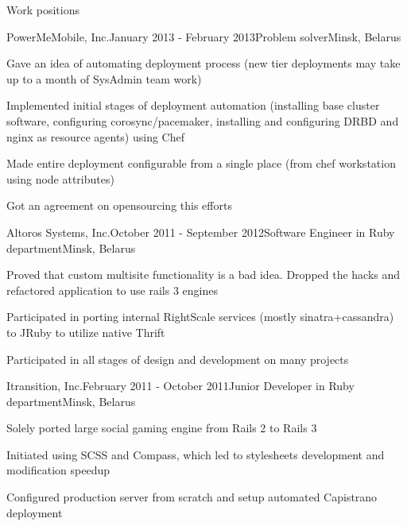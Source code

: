 \documentclass{resume} %
\begin{document}
\begin{rSection}{Work positions}
\begin{rSubsection}{PowerMeMobile, Inc.}{January 2013 - February 2013}{Problem solver}{Minsk, Belarus}
\item Gave an idea of automating deployment process (new tier deployments may take up to
  a month of SysAdmin team work)
\item Implemented initial stages of deployment automation (installing base cluster software,
  configuring corosync/pacemaker, installing and configuring DRBD and nginx as resource agents) using Chef
\item Made entire deployment configurable from a single place (from chef workstation using node attributes)
\item Got an agreement on opensourcing this efforts
\end{rSubsection}

\begin{rSubsection}{Altoros Systems, Inc.}{October 2011 - September 2012}{Software Engineer in Ruby department}{Minsk, Belarus}
\item Proved that custom multisite functionality is a bad idea. Dropped the hacks and refactored application to use rails 3 engines
\item Participated in porting internal RightScale services (mostly sinatra+cassandra) to JRuby to utilize native Thrift
\item Participated in all stages of design and development on many projects
\end{rSubsection}

\begin{rSubsection}{Itransition, Inc.}{February 2011 - October 2011}{Junior Developer in Ruby department}{Minsk, Belarus}
\item Solely ported large social gaming engine from Rails 2 to Rails 3
\item Initiated using SCSS and Compass, which led to stylesheets development and modification speedup
\item Configured production server from scratch and setup automated Capistrano deployment
\end{rSubsection}

\end{rSection}

\end{document}

